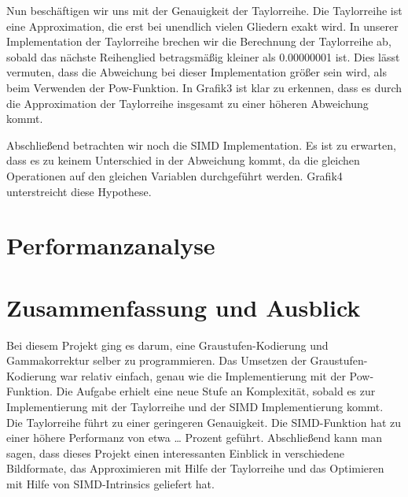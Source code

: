 \documentclass[course=erap]{aspdoc}
\begin{document}
\par
Nun beschäftigen wir uns mit der Genauigkeit der Taylorreihe. Die Taylorreihe ist eine Approximation, die erst bei unendlich vielen Gliedern exakt wird. In unserer Implementation der Taylorreihe brechen wir die Berechnung der Taylorreihe ab, sobald das nächste Reihenglied betragsmäßig kleiner als 0.00000001 ist. Dies lässt vermuten, dass die Abweichung bei dieser Implementation größer sein wird, als beim Verwenden der Pow-Funktion. In Grafik3 ist klar zu erkennen, dass es durch die Approximation der Taylorreihe insgesamt zu einer höheren Abweichung kommt.


\par
Abschließend betrachten wir noch die SIMD Implementation. Es ist zu erwarten, dass es zu keinem Unterschied in der Abweichung kommt, da die gleichen Operationen auf den gleichen Variablen durchgeführt werden. Grafik4 unterstreicht diese Hypothese.

\section{Performanzanalyse}


\section{Zusammenfassung und Ausblick}
\par
Bei\cite{vmintromiami} diesem Projekt ging es darum, eine Graustufen-Kodierung und Gammakorrektur selber zu programmieren. Das Umsetzen der Graustufen-Kodierung war relativ einfach, genau wie die Implementierung mit der Pow-Funktion. Die Aufgabe erhielt eine neue Stufe an Komplexität, sobald es zur Implementierung mit der Taylorreihe und der SIMD Implementierung kommt. Die Taylorreihe führt zu einer geringeren Genauigkeit. Die SIMD-Funktion hat zu einer höhere Performanz von etwa … Prozent geführt. Abschließend kann man sagen, dass dieses Projekt einen interessanten Einblick in verschiedene Bildformate, das Approximieren mit Hilfe der Taylorreihe und das Optimieren mit Hilfe von SIMD-Intrinsics geliefert hat.



\end{document}
